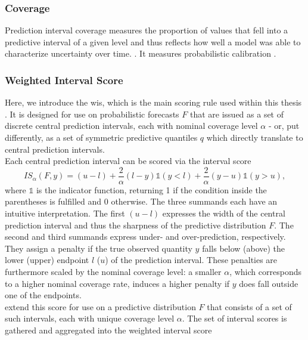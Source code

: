 \subsubsection{Coverage}
Prediction interval coverage measures the proportion of values that fell into a predictive interval of a given level and thus reflects how well a model was able to characterize uncertainty over time.\citep{cramer_evaluation_nodate} . It measures probabilistic calibration \citep{bosse_evaluating_2022}.
\subsubsection{Weighted Interval Score}
Here, we introduce the \ac{wis}, which is the main scoring rule used within this thesis \cite{bracher_evaluating_2021}. It is designed for use on probabilistic forecasts \cite{european_covid-19_forecast_hub_european_2021} $F$ that are issued as a set of discrete central prediction intervals, each with nominal coverage level $\alpha$ - or, put differently, as a set of symmetric predictive quantiles $q$ which directly translate to central prediction intervals. \\
Each central prediction interval can be scored via the interval score \citep{gneiting_strictly_2007}
\begin{equation}
IS_{\alpha}(F, y) = (u-l) + \frac{2}{\alpha}(l - y)\mathbb{1}(y < l) + \frac{2}{\alpha}(y - u)\mathbb{1}(y > u),
\end{equation}
where $\mathbb{1}$ is the indicator function, returning 1 if the condition inside the parentheses is fulfilled and 0 otherwise. The three summands each have an intuitive interpretation. The first $(u-l)$ expresses the width of the central prediction interval and thus the sharpness of the predictive distribution $F$. The second and third summands express under- and over-prediction, respectively. They assign a penalty if the true observed quantity $y$ falls below (above) the lower (upper) endpoint $l$ ($u$) of the prediction interval. These penalties are furthermore scaled by the nominal coverage level: a smaller $\alpha$, which corresponds to a higher nominal coverage rate, induces a higher penalty if $y$ does fall outside one of the endpoints. \\
\cite{bracher_evaluating_2021} extend this score for use on a predictive distribution $F$ that consists of a set of such intervals, each with unique coverage level $\alpha$. The set of interval scores is gathered and aggregated into the weighted interval score
